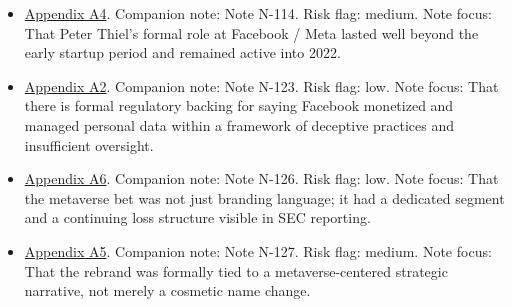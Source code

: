 \documentclass[
  american,
  11pt,
  letterpaper,
]{article}
\begin{document}
\begin{itemize}
  Peter Thiel had a formal governance role inside Facebook at the time
  of the IPO filing and that the role dated back to 2005.
\item
  \hyperref[appendix-a4-meta-platforms-inc-2022-definitive-proxy-statement]{Appendix
  A4}. Companion note: Note N-114. Risk flag: medium. Note focus: That
  Peter Thiel's formal role at Facebook / Meta lasted well beyond the
  early startup period and remained active into 2022.
\item
  \hyperref[appendix-a2-ftc-imposes-5-billion-penalty-and-sweeping-new-privacy-restrictions-on-facebook]{Appendix
  A2}. Companion note: Note N-123. Risk flag: low. Note focus: That
  there is formal regulatory backing for saying Facebook monetized and
  managed personal data within a framework of deceptive practices and
  insufficient oversight.
\item
  \hyperref[appendix-a6-meta-platforms-inc-2023-annual-report-form-10-k]{Appendix
  A6}. Companion note: Note N-126. Risk flag: low. Note focus: That the
  metaverse bet was not just branding language; it had a dedicated
  segment and a continuing loss structure visible in SEC reporting.
\item
  \hyperref[appendix-a5-the-facebook-company-is-now-meta]{Appendix A5}.
  Companion note: Note N-127. Risk flag: medium. Note focus: That the
  rebrand was formally tied to a metaverse-centered strategic narrative,
  not merely a cosmetic name change.
\end{itemize}
\end{document}
